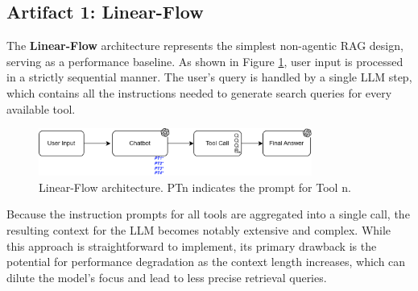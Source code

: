 
    \subsection{Artifact 1: Linear-Flow}

        The \textbf{Linear-Flow} architecture represents the simplest non-agentic RAG design, serving as a performance baseline. As shown in Figure \ref{fig:diagrama_linear_flow}, user input is processed in a strictly sequential manner. The user's query is handled by a single LLM step, which contains all the instructions needed to generate search queries for every available tool.
        
        \begin{figure}[h]
            \centering
            \includegraphics[width=0.8\textwidth]{images_exp2/diagrams/diagrama_linear_flow.png}
            \caption{Linear-Flow architecture. PTn indicates the prompt for Tool n.}
            \label{fig:diagrama_linear_flow}
        \end{figure}

        Because the instruction prompts for all tools are aggregated into a single call, the resulting context for the LLM becomes notably extensive and complex. While this approach is straightforward to implement, its primary drawback is the potential for performance degradation as the context length increases, which can dilute the model's focus and lead to less precise retrieval queries.
        

        

